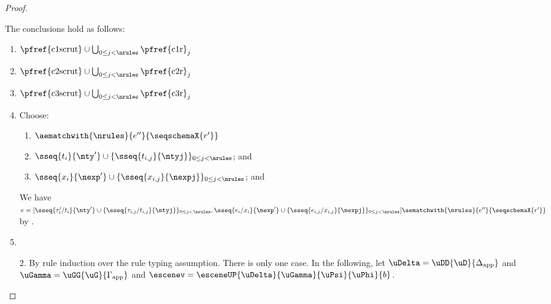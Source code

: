 \begin{proof}
\begin{enumerate}
\begin{grayparbox}
\begin{byCases}
  The conclusions hold as follows:
  \begin{enumerate}
    \item $\text{\pfref{c1scrut}} \cup \bigcup_{0 \leq j < \nrules} \text{\pfref{c1r}}_j$
    \item $\text{\pfref{c2scrut}} \cup \bigcup_{0 \leq j < \nrules} \text{\pfref{c2r}}_j$
    \item $\text{\pfref{c3scrut}} \cup \bigcup_{0 \leq j < \nrules} \text{\pfref{c3r}}_j$
    \item Choose:
      \begin{enumerate}
              \item $\aematchwith{\nrules}{e''}{\seqschemaX{r'}}$
      \item $\sseq{t_i}{\nty'} \cup \{ \sseq{t_{i,j}}{\ntyj} \}_{0 \leq j < \nrules}$; and
      \item $\sseq{x_i}{\nexp'} \cup \{ \sseq{x_{i,j}}{\nexpj} \}_{0 \leq j < \nrules}$; and 
      \end{enumerate}
      We have $e = [\sseq{\tau'_i/t_i}{\nty'} \cup \{ \sseq{\tau_{i,j}/t_{i,j}}{\ntyj} \}_{0 \leq j < \nrules}, \sseq{e_i/x_i}{\nexp'} \cup \{ \sseq{e_{i,j}/x_{i,j}}{\nexpj} \}_{0 \leq j < \nrules}]\aematchwith{\nrules}{e''}{\seqschemaX{r'}}$ by .
    \item {}
  \end{enumerate}
  \resetpfcounter
\end{byCases}
\end{grayparbox}
\end{enumerate}
\vspace{-2px}\begin{grayparbox}\vspace{2px}
\begin{enumerate}
\item[2.] By rule induction over the rule typing assumption. There is only one case. In the following, let $\uDelta=\uDD{\uD}{\Delta_\text{app}}$ and $\uGamma=\uGG{\uG}{\Gamma_\text{app}}$ and $\escenev=\esceneUP{\uDelta}{\uGamma}{\uPsi}{\uPhi}{b}$.
\end{enumerate}
\end{grayparbox}
\end{proof}

